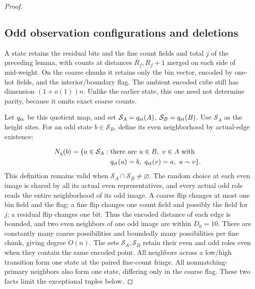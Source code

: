 \begin{proof}
\subsection{Odd observation configurations and deletions}
\label{sec:odd-observation-configurations-and-deletions}

A state retains the residual bits and the fine count fields and total
\(j\) of the preceding lemma, with counts at distances \(R_f,R_f+1\)
merged on each side of mid-weight. On the coarse chunks it retains only
the bin vector, encoded by one-hot fields, and the interior/boundary flag.
The ambient encoded cube still has dimension \((1+o(1))n\).
Unlike the earlier state, this one need not determine parity, because
it omits exact coarse counts.

Let \(q_{\rm st}\) be this quotient map, and set
\(\mathcal S_A=q_{\rm st}(A)\), \(\mathcal S_B=q_{\rm st}(B)\).
Use \(\mathcal S_A\) as the height sites. For an odd state
\(b\in\mathcal S_B\), define its even neighborhood by actual-edge
existence:

\[
 \begin{aligned}
 N_{\mathrm q}(b)=\{a\in\mathcal S_A:\ &
   \text{there are }u\in B,\ v\in A\text{ with }\\
 & q_{\rm st}(u)=b,\ q_{\rm st}(v)=a,\ u\sim v\}.
 \end{aligned}
\]
This definition remains valid when \(\mathcal S_A\cap\mathcal S_B\ne\varnothing\). The random choice at each even image is shared by all its actual even representatives, and every actual odd role reads the entire neighborhood of its odd image. A coarse flip changes at most one bin field and the flag; a fine flip
changes one count field and possibly the field for \(j\); a residual
flip changes one bit. Thus the encoded distance of each edge is bounded,
and two even neighbors of one odd image are within \(D_0=10\).
There are constantly many coarse possibilities and boundedly many
possibilities per fine chunk, giving degree \(O(n)\).
The sets \(\mathcal S_A,\mathcal S_B\) retain their even and odd roles
even when they contain the same encoded point. All neighbors across a
low/high transition form one state at the paired fine-count fringe.
All nonmatching-primary neighbors also form one state, differing only in
the coarse flag. These two facts limit the exceptional tuples below.


\end{proof}
